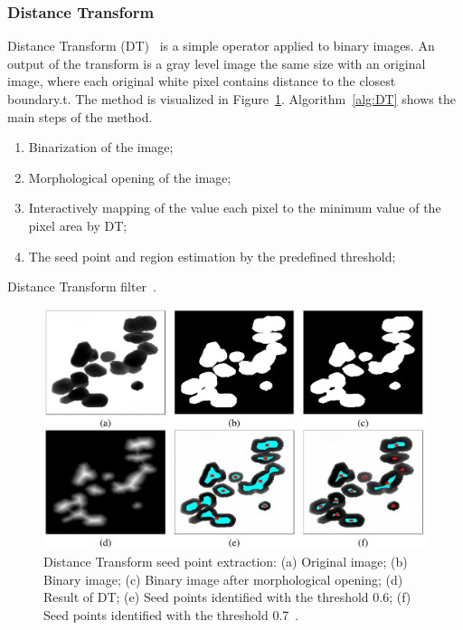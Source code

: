 \documentclass{lutmscthesis}[2010/09/22]
\begin{document}
\subsubsection{Distance Transform}

Distance Transform (DT)~\cite{DT} is a simple operator applied to binary images. An output of the transform is a gray level image the same size with an original image, where each original white pixel contains distance to the closest boundary.t.
The method is visualized in Figure~\ref{fig:DT_img}. Algorithm~\ref{alg:DT} shows the main steps of the method.

\begin{algorithm} [H]
   \begin{enumerate}
        \item Binarization of the image;
        \item Morphological opening of the image;
        \item Interactively mapping of the value each pixel to the minimum value of the pixel area by DT;
        \item The seed point and region estimation by the predefined threshold;
    \end{enumerate}
    \caption{Distance Transform filter~\cite{DT-bactery}.}\label{alg:DT}
\end{algorithm}

\begin{figure} [ht]
  \includegraphics[width=\linewidth]{DT.png}
  \caption{
    Distance Transform seed point extraction: (a) Original image; (b) Binary image;
    (c) Binary image after morphological opening; 
    (d) Result of DT; 
    (e) Seed points identified with the threshold 0.6; 
    (f) Seed points identified with the threshold 0.7~\cite{zafari-thesis}.}
  \label{fig:DT_img}
\end{figure}
\end{document}
